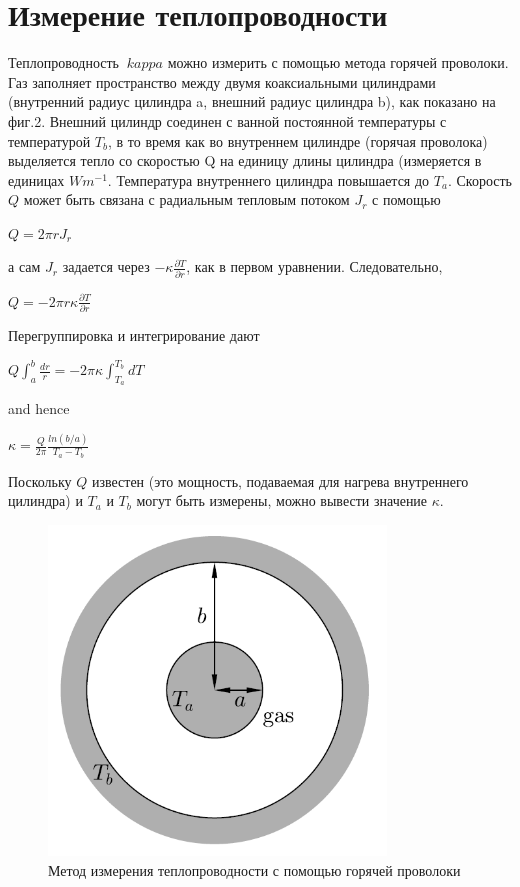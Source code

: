 \documentclass[a4paper, 12pt]{article}%
\begin{document}
\section{Измерение теплопроводности} 
Теплопроводность $\ kappa$ можно измерить с помощью метода горячей проволоки. Газ заполняет пространство между двумя коаксиальными цилиндрами (внутренний радиус цилиндра a, внешний радиус цилиндра b), как показано на фиг.2. Внешний цилиндр соединен с ванной постоянной температуры с температурой $T_b$, в то время как во внутреннем цилиндре (горячая проволока) выделяется тепло со скоростью Q на единицу длины цилиндра (измеряется в единицах $ Wm ^ {-1}$. Температура внутреннего цилиндра повышается до $T_a$. Скорость $Q$ может быть связана с радиальным тепловым потоком $J_r$ с помощью
\begin{center}
$Q = 2 \pi r J_r$
\end{center}
а сам $J_r$ задается через $-\kappa \frac{\partial T}{\partial r}$, как в первом уравнении. Следовательно,
\begin{center}
$Q = {-2} \pi r \kappa \frac{\partial T}{\partial r} $
\end{center}
Перегруппировка и интегрирование дают
\begin{center}

$Q \int_{a}^{b} \frac{dr}{r} = -2\pi\kappa\int_{T_a}^{T_b}dT $
\end{center}
and hence
\begin{center}
$\kappa = \frac{Q}{2\pi}\frac{ln(b/a)}{T_a - T_b} $
\end{center}
Поскольку $Q$ известен (это мощность, подаваемая для нагрева внутреннего цилиндра) и $T_a$ и $T_b$ могут быть измерены, можно вывести значение $\kappa$.
\begin{figure}[h]
\begin{center}
\includegraphics[width = 0.8\textwidth]{B3.png}
\caption{Метод измерения теплопроводности с помощью горячей проволоки}
\end{center}
\end{figure}
\newpage
\end{document}
